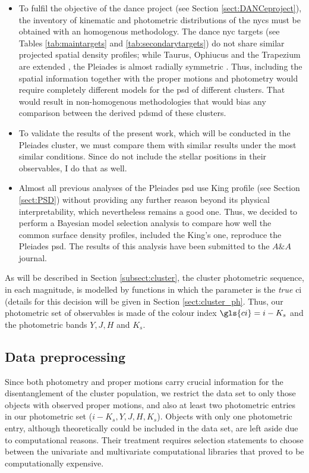 \begin{itemize}

\item To fulfil the objective of the \gls{dance} project (see Section \ref{sect:DANCeproject}), the inventory of kinematic and photometric distributions of the \glspl{nyc} must be obtained with an homogenous methodology. The \gls{dance} \gls{nyc} targets (see Tables \ref{tab:maintargets} and \ref{tab:secondarytargets}) do not share similar projected spatial density profiles; while Taurus, Ophiucus and the Trapezium are extended \cite[see for example][]{simon1997}, the Pleiades is almost radially symmetric \citep{Raboud1998}. Thus, including the spatial information together with the proper motions and photometry would require completely different models for the \gls{psd} of different clusters. That would result in non-homogenous methodologies that would bias any comparison between the derived \gls{pdsmd} of these clusters.
\item To validate the results of the present work, which will be conducted in the Pleiades cluster, we must compare them with similar results under the most similar conditions. Since \citet{Bouy2015,Sarro2014} do not include the stellar positions in their observables, I do that as well. 
\item Almost all previous analyses of the Pleiades \gls{psd} use King profile (see Section \ref{sect:PSD}) without providing any further reason beyond its physical interpretability, which nevertheless remains a good one. Thus, we decided to perform a Bayesian model selection analysis to compare how well the common surface density profiles, included the King's one, reproduce the Pleiades \gls{psd}. The results of this analysis have been submitted to the $A\&A$ journal.
\end{itemize}

As will be described in Section \ref{subsect:cluster}, the cluster photometric sequence, in each magnitude, is modelled by functions in which the parameter is the \emph{true} \gls{ci} (details for this decision will be given in Section \ref{sect:cluster_ph}. Thus, our photometric set of observables is made of the colour index $\gls{ci}=i-K_s$ and the photometric bands $Y,J,H$ and $K_s$. 

\subsection{Data preprocessing}

Since both photometry and proper motions carry crucial information for the disentanglement of the cluster population, we restrict the data set to only those objects with observed proper motions, and also at least two photometric entries in our photometric set ($i-K_s,Y,J,H,K_s$). Objects with only one photometric entry, although theoretically could be included in the data set, are left aside due to computational reasons. Their treatment requires selection statements to choose between the univariate and multivariate computational libraries that proved to be computationally expensive.

